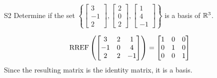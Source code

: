 \begin{problem}{S2}
  Determine if the set \(\left\{
    \begin{bmatrix} 3 \\ -1 \\ 2 \end{bmatrix},
    \begin{bmatrix} 2 \\ 0 \\ 2 \end{bmatrix},
    \begin{bmatrix} 1 \\ 4 \\ -1 \end{bmatrix}
  \right\}\) is a basis of \(\mathbb{R}^3\).
\end{problem}
\begin{solution}
  \[\operatorname{RREF}\left(
    \begin{bmatrix}
      3 & 2 & 1 \\
      -1 & 0 & 4 \\
      2 & 2 & -1
    \end{bmatrix} \right)= \begin{bmatrix}
      1 & 0 &0 \\
      0 & 1 & 0 \\
      0 & 0 & 1
    \end{bmatrix}
  \]
Since the resulting matrix is the identity matrix, it is a basis.
\end{solution}



